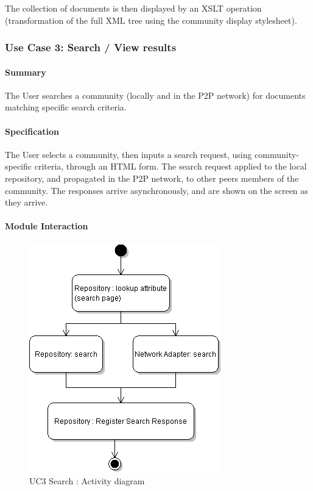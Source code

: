 \documentclass[titlepage]{article}%
\begin{document}
The collection of documents is then displayed by an XSLT operation (transformation of the full XML tree using the community display stylesheet).

\subsubsection{Use Case 3: Search / View results} 
\paragraph{Summary}
The User searches a community (locally and in the P2P network) for documents matching specific search criteria.

\paragraph{Specification}
The User selects a community, then inputs a search request, using community-specific criteria, through an HTML form. The search request applied to the local repository, and propagated in the P2P network, to other peers members of the community. The responses arrive asynchronously, and are shown on the screen as they arrive. 

\paragraph{Module Interaction}

\begin{figure}[htb]
\centering
	\includegraphics[scale=0.5]{diagrams/uc3-search.png}
	\caption{UC3 Search : Activity diagram}
	\label{fig:uc3}
\end{figure}
\end{document}
